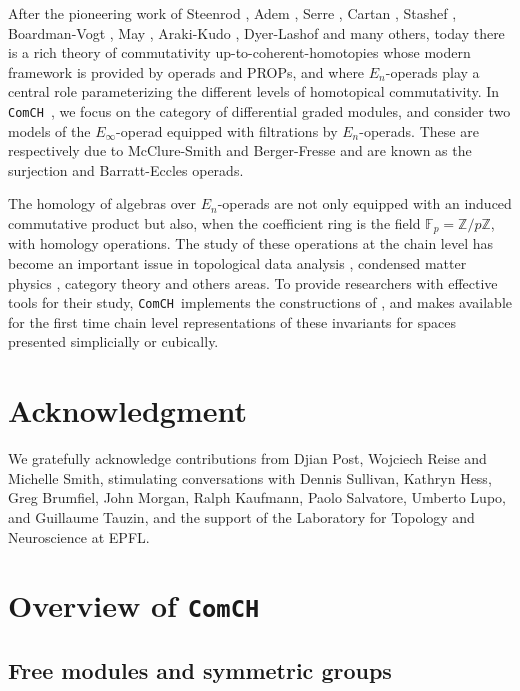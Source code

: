 \documentclass{amsart}
\newcommand{\comch}{\texttt{ComCH }}
\begin{document}
After the pioneering work of Steenrod \cite{Steenrod47, Steenrod62}, Adem \cite{Adem52}, Serre \cite{Serre53}, Cartan \cite{Cartan55}, Stashef \cite{Stasheff63}, Boardman-Vogt \cite{BoardmanVogt73}, May \cite{May70algebraic, May72geometry}, Araki-Kudo \cite{ArakiKudo56}, Dyer-Lashof \cite{DyerLashof62} and many others, today there is a rich theory of commutativity up-to-coherent-homotopies whose modern framework is provided by operads and PROPs, and where $E_n$-operads play a central role parameterizing the different levels of homotopical commutativity. In \comch, we focus on the category of differential graded modules, and consider two models of the $E_\infty$-operad equipped with filtrations by $E_n$-operads. These are respectively due to McClure-Smith \cite{McClureSmith03} and Berger-Fresse \cite{BergerFresse04} and are known as the surjection and Barratt-Eccles operads.

The homology of algebras over $E_n$-operads are not only equipped with an induced commutative product but also, when the coefficient ring is the field $\mathbb F_p = \mathbb Z/ p\mathbb Z$, with homology operations. The study of these operations at the chain level has become an important issue in topological data analysis \cite{medina2018persistence}, condensed matter physics \cite{kapustin2017fermionic}, category theory \cite{medina2020globular} and others areas. To provide researchers with effective tools for their study, \comch implements the constructions of \cite{medina2020chain}, and makes available for the first time chain level representations of these invariants for spaces presented simplicially or cubically.

\section*{Acknowledgment}
We gratefully acknowledge contributions from Djian Post, Wojciech Reise and Michelle Smith, stimulating conversations with Dennis Sullivan, Kathryn Hess, Greg Brumfiel, John Morgan, Ralph Kaufmann, Paolo Salvatore, Umberto Lupo, and Guillaume Tauzin, and the support of the Laboratory for Topology and Neuroscience at EPFL.

\section{Overview of \comch}

\subsection{Free modules and symmetric groups}
\end{document}
